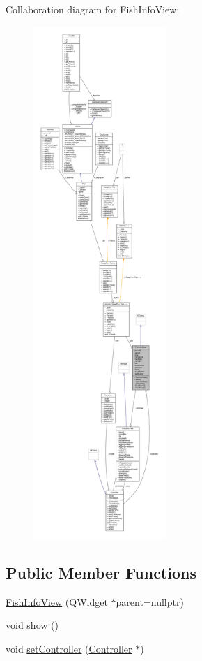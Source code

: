Collaboration diagram for Fish\+Info\+View\+:\nopagebreak
\begin{figure}[H]
\begin{center}
\leavevmode
\includegraphics[height=550pt]{classFishInfoView__coll__graph}
\end{center}
\end{figure}
\subsection*{Public Member Functions}
\begin{DoxyCompactItemize}
\item 
\hyperlink{classFishInfoView_aa1baa9e5f073be8bde338beebc4ac209_aa1baa9e5f073be8bde338beebc4ac209}{Fish\+Info\+View} (Q\+Widget $\ast$parent=nullptr)
\item 
void \hyperlink{classFishInfoView_aa4bf1bcf24807044f11a6b22b26431d5_aa4bf1bcf24807044f11a6b22b26431d5}{show} ()
\item 
void \hyperlink{classFishInfoView_ab7dbcbf32286d7f3699cdad3664e7830_ab7dbcbf32286d7f3699cdad3664e7830}{set\+Controller} (\hyperlink{classController}{Controller} $\ast$)
\end{DoxyCompactItemize}
